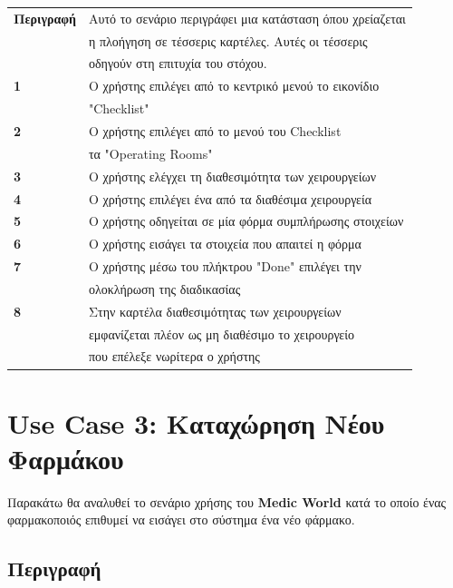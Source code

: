 \documentclass{article}
\newcommand\T{\rule{0pt}{2.6ex}}       %
\newcommand\B{\rule[-1.2ex]{0pt}{0pt}}
\begin{document}
 \begin{center}
     \begin{tabular}{|l|l|}
     \hline
      \textbf{Περιγραφή }   & Αυτό το σενάριο περιγράφει μια κατάσταση όπου χρείαζεται\\& η πλοήγηση σε τέσσερις καρτέλες. Αυτές οι τέσσερις\\& οδηγούν στη επιτυχία του στόχου. \T\B \\ 
      \hline
      \textbf{1} & Ο χρήστης επιλέγει από το κεντρικό μενού το εικονίδιο\\& "Checklist" \T\B \\
      \hline
      \textbf{2} & Ο χρήστης επιλέγει από το μενού του Checklist\\& τα "Operating Rooms" \T\B \\
      \hline
      \textbf{3} & Ο χρήστης ελέγχει τη διαθεσιμότητα των χειρουργείων \T\B \\
      \hline
      \textbf{4} & Ο χρήστης επιλέγει ένα από τα διαθέσιμα χειρουργεία \T\B \\
      \hline
      \textbf{5} & Ο χρήστης οδηγείται σε μία φόρμα συμπλήρωσης στοιχείων \T\B \\
      \hline
      \textbf{6} & Ο χρήστης εισάγει τα στοιχεία που απαιτεί η φόρμα\T\B \\
      \hline
      \textbf{7} & Ο χρήστης μέσω του πλήκτρου "Done" επιλέγει την\\& ολοκλήρωση της διαδικασίας \T\B \\
      \hline
      \textbf{8} & Στην καρτέλα διαθεσιμότητας των χειρουργείων\\& εμφανίζεται πλέον ως μη διαθέσιμο το χειρουργείο\\& που επέλεξε νωρίτερα ο χρήστης \T\B \\
      \hline
     \end{tabular}
 \end{center}
 

  \section{Use Case 3: Καταχώρηση Νέου Φαρμάκου }
 
 Παρακάτω θα αναλυθεί το σενάριο χρήσης του \textbf{Medic World} κατά το οποίο ένας φαρμακοποιός επιθυμεί να εισάγει στο σύστημα ένα νέο φάρμακο.
 
\subsection{Περιγραφή}
\end{document}
